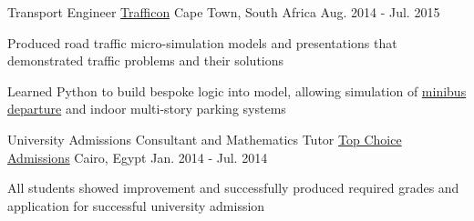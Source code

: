 \begin{cventries}
  \cventry
    {Transport Engineer} %
    {\href{http://trafficon.co.za}{Trafficon}} %
    {Cape Town, South Africa} %
    {Aug. 2014 - Jul. 2015} %
    {
      \begin{cvitems} %
        \item {Produced road traffic micro-simulation models and presentations that demonstrated traffic problems and their solutions}
        \item {Learned Python to build bespoke logic into model, allowing simulation of \href{https://www.youtube.com/watch?v=RjTvDzyl8WA}{minibus departure} and indoor multi-story parking systems}
      \end{cvitems}
    }

  \cventry
    {University Admissions Consultant and Mathematics Tutor} %
    {\href{http://www.cairowestmag.com/top-choice-admissions/}{Top Choice Admissions}} %
    {Cairo, Egypt} %
    {Jan. 2014 - Jul. 2014} %
    {
      \begin{cvitems} %
        \item {All students showed improvement and successfully produced required grades and application for successful university admission}
      \end{cvitems}
    }

\end{cventries}
